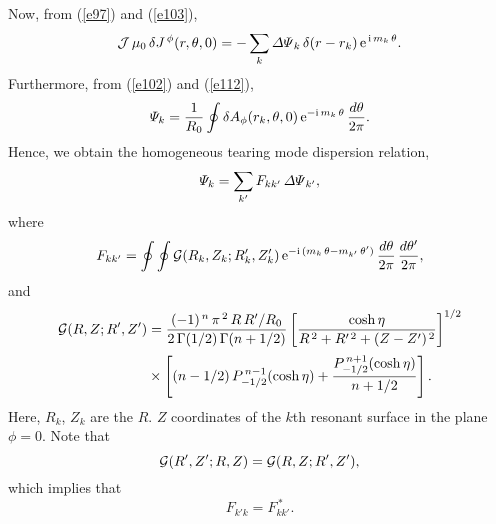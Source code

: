 \documentclass[12pt]{article}
\begin{document}
Now, from (\ref{e97}) and (\ref{e103}), 
\begin{equation}
{\cal J}\,\mu_0\,\delta J^{\,\phi}(r,\theta,0)=-\sum_k {\mit\Delta\Psi}_k\,\delta (r-r_k)\,{\rm e}^{\,{\rm i}\,m_k\,\theta}.
\end{equation}
Furthermore, from (\ref{e102}) and (\ref{e112}), 
\begin{equation}
{\mit\Psi}_k = \frac{1}{R_0}\oint \delta A_{\phi}(r_k,\theta,0)\,{\rm e}^{-{\rm i}\,m_k\,\theta}\,\frac{d\theta}{2\pi}.
\end{equation}
Hence, we obtain the homogeneous tearing mode dispersion relation, 
\begin{equation}
{\mit\Psi}_k = \sum_{k'} F_{kk'}\,{\mit\Delta\Psi}_{k'},
\end{equation}
where
\begin{equation}
F_{kk'} = \oint\oint 
{\cal G}(R_k,Z_k;R_k',Z_k')\,{\rm e}^{-{\rm i}\,(m_k\,\theta-m_{k'}\,\theta')}\,\frac{d\theta}{2\pi}\,\frac{d\theta'}{2\pi},
\end{equation}
and
\begin{align}
{\cal G}(R,Z;R',Z')&= \frac{(-1)^{\,n}\,\pi^{\,2}\,R\,R'/R_0}{2\,\Gamma(1/2)\,\Gamma(n+1/2)}
\left[\frac{\cosh\eta}{R^{\,2}+R'^{\,2}+(Z-Z')^{\,2}}\right]^{1/2}\nonumber\\[0.5ex]
&\times\left[(n-1/2)\,P_{-1/2}^{\,n-1}(\cosh\eta)+
\frac{P_{-1/2}^{\,n+1}(\cosh\eta)}{n+1/2}\right].
\end{align}
Here, $R_k$, $Z_k$ are the $R$. $Z$ coordinates of the $k$th resonant surface in the plane $\phi=0$. 
Note that
\begin{equation}
{\cal G} (R',Z';R,Z) = {\cal G}(R,Z;R',Z'),
\end{equation}
which implies that
\begin{equation}
F_{k'k} = F_{kk'}^{\,\ast}.
\end{equation}
\end{document}
